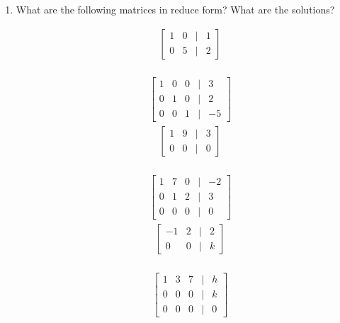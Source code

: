 \documentclass[14pt]{extarticle}
\begin{document}
\begin{enumerate}
	\item What are the following matrices in reduce form? What are the solutions?
	\begin{multicols}{3}
		\begin{align*}
			&\begin{bmatrix}
				1 & 0 & | & 1\\
				0 & 5 & | & 2
			\end{bmatrix} 
		\end{align*}
		\\
		\begin{align*}
			&\begin{bmatrix}
				1 & 0 & 0 & | & 3\\
				0 & 1 & 0 & | & 2 \\
				0 & 0 & 1 & | & -5
			\end{bmatrix} 
		\end{align*}
		\vfill\null
		\columnbreak
		\begin{align*}
			&\begin{bmatrix}
				1 & 9 & | & 3\\
				0 & 0 & | & 0
			\end{bmatrix} 
		\end{align*}
		\\
		\begin{align*}
			&\begin{bmatrix}
				1 & 7 & 0 & | & -2\\
				0 & 1 & 2 & | & 3 \\
				0 & 0 & 0 & | & 0
			\end{bmatrix} 
		\end{align*}
		\vfill\null
		\columnbreak
		\begin{align*}
			&\begin{bmatrix}
				-1 & 2 & | & 2\\
				0 & 0 & | & k
			\end{bmatrix} 
		\end{align*}
		\\
		\begin{align*}
			&\begin{bmatrix}
				1 & 3 & 7 & | & h\\
				0 & 0 & 0 & | & k \\
				0 & 0 & 0 & | & 0
			\end{bmatrix} 
		\end{align*}
		\vfill\null
	\end{multicols}
	

\end{enumerate}
\end{document}
